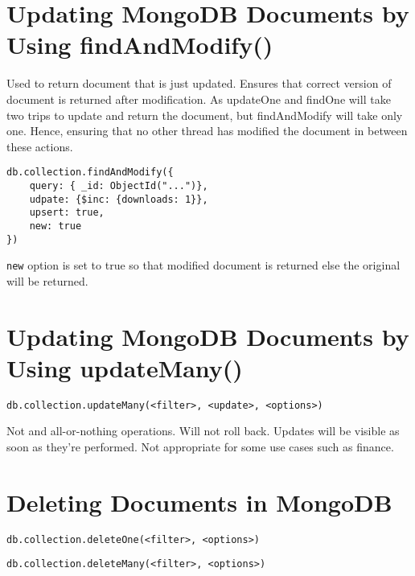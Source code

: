 \documentclass[../main.tex]{subfiles}
\begin{document}
\section{Updating MongoDB Documents by Using findAndModify()}
Used to return document that is just updated.
Ensures that correct version of document is returned after modification.
As updateOne and findOne will take two trips to update and return the document, but findAndModify will take only one. Hence, ensuring that no other thread has modified the document in between these actions.

\begin{lstlisting}[language=MongoDB, caption=findAndModify method syntax]
db.collection.findAndModify({
	query: { _id: ObjectId("...")}, 
	udpate: {$inc: {downloads: 1}}, 
	upsert: true,
	new: true
})
\end{lstlisting}
\lstinline{new} option is set to true so that modified document is returned else the original will be returned.

\section{Updating MongoDB Documents by Using updateMany()}

\begin{lstlisting}[language=MongoDB, caption=updateMany method syntax]
db.collection.updateMany(<filter>, <update>, <options>)
\end{lstlisting}

Not and all-or-nothing operations.
Will not roll back.
Updates will be visible as soon as they're performed.
Not appropriate for some use cases such as finance.

\section{Deleting Documents in MongoDB}

\begin{lstlisting}[language=MongoDB, caption=deleteOne method syntax]
db.collection.deleteOne(<filter>, <options>)
\end{lstlisting}

\begin{lstlisting}[language=MongoDB, caption=deleteMany method syntax]
db.collection.deleteMany(<filter>, <options>)
\end{lstlisting}



\printglossaries
\end{document}
